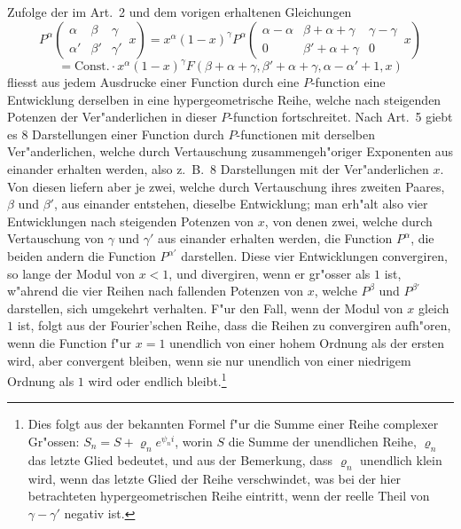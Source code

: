 \documentclass[12pt,a4paper]{book}
\theoremstyle{definition}
\theoremstyle{remark}
\begin{document}
Zufolge der im Art.~2 und dem vorigen erhaltenen Gleichungen
\[
P^{\alpha} \left(\begin{array}{ccc|} \alpha & \beta & \gamma \\ \alpha' & \beta' & \gamma' \end{array}\, x\right) = x^{\alpha} (1 - x)^{\gamma} P^{\alpha} \left(\begin{array}{ccc|} \alpha - \alpha & \beta + \alpha + \gamma & \gamma - \gamma \\ 0 & \beta' + \alpha + \gamma & 0 \end{array}\, x\right)
\]
\[
= \text{Const.} \cdot x^{\alpha} (1 - x)^{\gamma} F(\beta + \alpha + \gamma, \beta' + \alpha + \gamma, \alpha - \alpha' + 1, x)
\]
fliesst aus jedem Ausdrucke einer Function durch eine $P$-function eine Entwicklung derselben in eine hypergeometrische Reihe, welche nach steigenden Potenzen der Ver{"a}nderlichen in dieser $P$-function fortschreitet. Nach Art.~5 giebt es 8 Darstellungen einer Function durch $P$-functionen mit derselben Ver{"a}nderlichen, welche durch Vertauschung zusammengeh{"o}riger Exponenten aus einander erhalten werden, also z.~B.\ 8 Darstellungen mit der Ver{"a}nderlichen $x$. Von diesen liefern aber je zwei, welche durch Vertauschung ihres zweiten Paares, $\beta$ und $\beta'$, aus einander entstehen, dieselbe Entwicklung; man erh{"a}lt also vier Entwicklungen nach steigenden Potenzen von $x$, von denen zwei, welche durch Vertauschung von $\gamma$ und $\gamma'$ aus einander erhalten werden, die Function $P^{\alpha}$, die beiden andern die Function $P^{\alpha'}$ darstellen. Diese vier Entwicklungen convergiren, so lange der Modul von $x < 1$, und divergiren, wenn er gr{"o}sser als $1$ ist, w{"a}hrend die vier Reihen nach fallenden Potenzen von $x$, welche $P^{\beta}$ und $P^{\beta'}$ darstellen, sich umgekehrt verhalten. F{"u}r den Fall, wenn der Modul von $x$ gleich $1$ ist, folgt aus der Fourier'schen Reihe, dass die Reihen zu convergiren aufh{"o}ren, wenn die Function f{"u}r $x = 1$ unendlich von einer hohem Ordnung als der ersten wird, aber convergent bleiben, wenn sie nur unendlich von einer niedrigem Ordnung als $1$ wird oder endlich bleibt.\footnote{Dies folgt aus der bekannten Formel f{"u}r die Summe einer Reihe complexer Gr{"o}ssen: $S_n = S + \varrho_n e^{\psi_n i}$, worin $S$ die Summe der unendlichen Reihe, $\varrho_n$ das letzte Glied bedeutet, und aus der Bemerkung, dass $\varrho_n$ unendlich klein wird, wenn das letzte Glied der Reihe verschwindet, was bei der hier betrachteten hypergeometrischen Reihe eintritt, wenn der reelle Theil von $\gamma - \gamma'$ negativ ist.}
\end{document}
